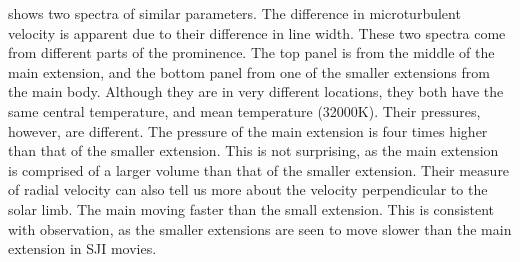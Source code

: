  shows two spectra of similar parameters. The difference in microturbulent velocity is apparent due to their difference in line width. These two spectra come from different parts of the prominence. The top panel is from the middle of the main extension, and the bottom panel from one of the smaller extensions from the main body. Although they are in very different locations, they both have the same central temperature, and mean temperature (32000K). Their pressures, however, are different. The pressure of the main extension is four times higher than that of the smaller extension. This is not surprising, as the main extension is comprised of a larger volume than that of the smaller extension. Their measure of radial velocity can also tell us more about the velocity perpendicular to the solar limb. The main moving faster than the small extension. This is consistent with observation, as the smaller extensions are seen to move slower than the main extension in SJI movies.
